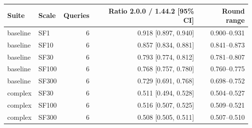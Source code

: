 \begin{tabular}{llrrr}
\toprule
Suite & Scale & Queries & Ratio 2.0.0 / 1.44.2 [95\% CI] & Round range \\
\midrule
baseline & SF1 & 6 & 0.918 [0.897, 0.940] & 0.900--0.931 \\
baseline & SF10 & 6 & 0.857 [0.834, 0.881] & 0.841--0.873 \\
baseline & SF30 & 6 & 0.793 [0.774, 0.812] & 0.781--0.807 \\
baseline & SF100 & 6 & 0.768 [0.757, 0.780] & 0.760--0.775 \\
baseline & SF300 & 6 & 0.729 [0.691, 0.768] & 0.698--0.752 \\
complex & SF30 & 6 & 0.511 [0.494, 0.528] & 0.504--0.527 \\
complex & SF100 & 6 & 0.516 [0.507, 0.525] & 0.509--0.521 \\
complex & SF300 & 6 & 0.508 [0.505, 0.511] & 0.507--0.510 \\
\bottomrule
\end{tabular}
